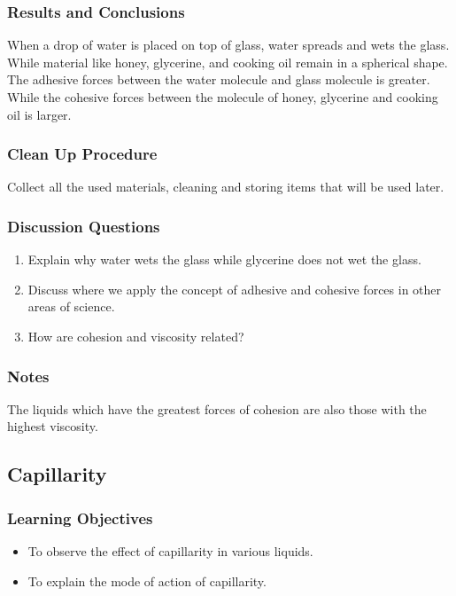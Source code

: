 \subsubsection*{Results and Conclusions}
When a drop of water is placed on top of glass, water spreads and wets the glass. While material like honey, glycerine, and cooking oil remain in a spherical shape. The adhesive forces between the water molecule and glass molecule is greater. While the cohesive forces between the molecule of honey, glycerine and cooking oil is larger.

\subsubsection*{Clean Up Procedure}
Collect all the used materials, cleaning and storing items that will be used later.

\subsubsection*{Discussion Questions}
\begin{enumerate}
\item{Explain why water wets the glass while glycerine does not wet the glass.}
\item{Discuss where we apply the concept of adhesive and cohesive forces in other areas of science.}
\item{How are cohesion and viscosity related?}
\end{enumerate}

\subsubsection*{Notes}
The liquids which have the greatest forces of cohesion are also those with the highest viscosity.

\subsection{Capillarity}

\subsubsection*{Learning Objectives}
\begin{itemize}
\item{To observe the effect of capillarity in various liquids.} 
\item{To explain the mode of action of capillarity.} 
\end{itemize}


